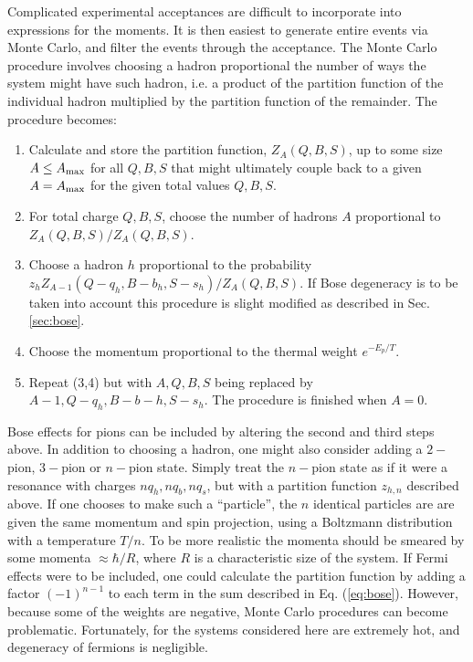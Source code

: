 \documentclass[aps,prc,nofootinbib,showpacs,superscriptaddress,groupedaddress]{revtex4-1}
\begin{document}
Complicated experimental acceptances are difficult to incorporate into expressions for the moments. It is then easiest to generate entire events via Monte Carlo, and filter the events through the acceptance. The Monte Carlo procedure involves choosing a hadron proportional the number of ways the system might have such hadron, i.e. a product of the partition function of the individual hadron multiplied by the partition function of the remainder. The procedure becomes:
\begin{enumerate}
\item Calculate and store the partition function, $Z_A(Q,B,S)$, up to some size $A\le A_{\rm max}$ for all $Q,B,S$ that might ultimately couple back to a given $A=A_{\rm max}$ for the given total values $Q,B,S$. 
\item For total charge $Q,B,S$, choose the number of hadrons $A$ proportional to $Z_A(Q,B,S)/Z_A(Q,B,S)$.
\item Choose a hadron $h$ proportional to the probability $z_hZ_{A-1}(Q-q_h,B-b_h,S-s_h)/Z_A(Q,B,S)$. If Bose degeneracy is to be taken into account this procedure is slight modified as described in Sec. \ref{sec:bose}.
\item Choose the momentum proportional to the thermal weight $e^{-E_p/T}$.
\item Repeat (3,4) but with $A,Q,B,S$ being replaced by $A-1,Q-q_h,B-b-h,S-s_h$. The procedure is finished when $A=0$.
\end{enumerate}
Bose effects for pions can be included by altering the second and third steps above. In addition to choosing a hadron, one might also consider adding a $2-$pion, $3-$pion or $n-$pion state. Simply treat the $n-$pion state as if it were a resonance with charges $nq_h,nq_b,nq_s$, but with a partition function $z_{h,n}$ described above. If one chooses to make such a ``particle'', the $n$ identical particles are are given the same momentum and spin projection, using a Boltzmann distribution with a temperature $T/n$. To be more realistic the momenta should be smeared by some momenta $\approx\hbar/R$, where $R$ is a characteristic size of the system. If Fermi effects were to be included, one could calculate the partition function by adding a factor $(-1)^{n-1}$ to each term in the sum described in Eq. (\ref{eq:bose}). However, because some of the weights are negative, Monte Carlo procedures can become problematic. Fortunately, for the systems considered here are extremely hot, and degeneracy of fermions is negligible.
\end{document}
